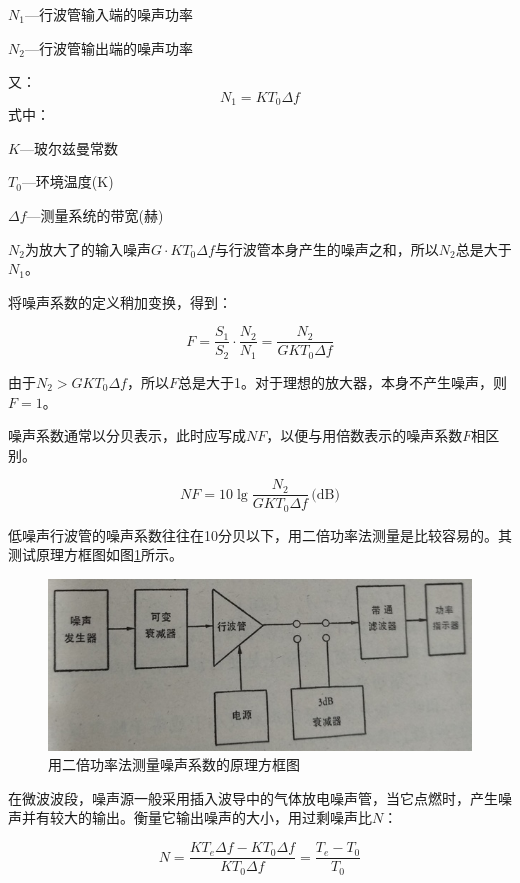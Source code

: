 $ N_1 $—行波管输入端的噪声功率


$ N_2 $—行波管输出端的噪声功率

又：
\begin{equation} \label{eq:11-3}
	N_1 = KT_0\Delta f
\end{equation}
式中：

$ K $—玻尔兹曼常数


$ T_0 $—环境温度(K)


$ \Delta f $—测量系统的带宽(赫)


$ N_2 $为放大了的输入噪声$ G\cdot K T_0 \Delta f $与行波管本身产生的噪声之和，所以$ N_2 $总是大于$ N_1 $。


将噪声系数的定义稍加变换，得到：

\begin{equation} \label{eq:11-4}
	F = \frac{S_1}{S_2}\cdot\frac{N_2}{N_1}=\frac{N_2}{GKT_0\Delta f}
\end{equation}

由于$ N_2 > GKT_0\Delta f $，所以$ F $总是大于1。对于理想的放大器，本身不产生噪声，则$ F=1 $。


噪声系数通常以分贝表示，此时应写成$ NF $，以便与用倍数表示的噪声系数$ F $相区别。

\begin{equation} \label{eq:11-5}
	NF = 10\lg \frac{N_2}{GKT_0 \Delta f}\,\textrm{(dB)}
\end{equation}

低噪声行波管的噪声系数往往在10分贝以下，用二倍功率法测量是比较容易的。其测试原理方框图如图\ref{ch11-7}所示。
\begin{figure}[phtb]
	\centering
	\includegraphics[width=0.6\linewidth]{figure/ch11-7}
	\caption{用二倍功率法测量噪声系数的原理方框图}
	\label{ch11-7}
\end{figure}

在微波波段，噪声源一般采用插入波导中的气体放电噪声管，当它点燃时，产生噪声并有较大的输出。衡量它输出噪声的大小，用过剩噪声比$ N $：

\begin{equation} \label{eq:11-6}
	N = \frac{KT_e\Delta f -KT_0\Delta f}{KT_0\Delta f} = \frac{T_e - T_0}{T_0}
\end{equation}

